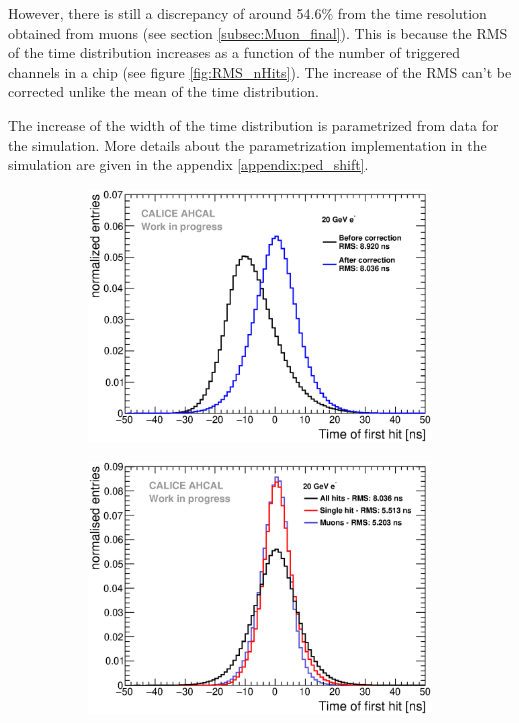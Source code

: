 However, there is still a discrepancy of around 54.6\% from the time resolution obtained from muons (see section \ref{subsec:Muon_final}). This is because the RMS of the time distribution increases as a function of the number of triggered channels in a chip (see figure \ref{fig:RMS_nHits}). The increase of the RMS can't be corrected unlike the mean of the time distribution.

The increase of the width of the time distribution is parametrized from data for the simulation. More details about the parametrization implementation in the simulation are given in the appendix \ref{appendix:ped_shift}.

\begin{figure}[htbp!]
	\begin{subfigure}[t]{0.49\textwidth}
		\centering
		\includegraphics[width=1\textwidth]{../Thesis_Plots/Timing/Electrons/Plots/Timing_AllLayers_20GeV.eps}
		\caption{}\label{fig:timing_electrons_corr}
	\end{subfigure}
	\hfill
	\begin{subfigure}[t]{0.49\textwidth}
		\centering
		\includegraphics[width=1\textwidth]{../Thesis_Plots/Timing/Electrons/Plots/ComparisonAll_ElectronsSingleHit.eps}

\end{subfigure}
\end{figure}
